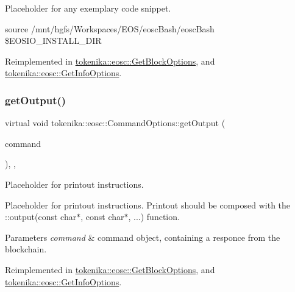 Placeholder for any exemplary code snippet. 

source /mnt/hgfs/\+Workspaces/\+E\+O\+S/eosc\+Bash/eosc\+Bash \$\+E\+O\+S\+I\+O\+\_\+\+I\+N\+S\+T\+A\+L\+L\+\_\+\+D\+IR 

Reimplemented in \hyperlink{classtokenika_1_1eosc_1_1_get_block_options_ace1d886b5fb260150df8d291339fbd03}{tokenika\+::eosc\+::\+Get\+Block\+Options}, and \hyperlink{classtokenika_1_1eosc_1_1_get_info_options_a652a64ac80195f98b33ae91a2b284316}{tokenika\+::eosc\+::\+Get\+Info\+Options}.

\mbox{\label{classtokenika_1_1eosc_1_1_command_options_a346dcfb00b8ac522169714544bfa7be0}} 
\subsubsection{\texorpdfstring{get\+Output()}{getOutput()}}
{\footnotesize\ttfamily virtual void tokenika\+::eosc\+::\+Command\+Options\+::get\+Output (\begin{DoxyParamCaption}\item[{\hyperlink{classtokenika_1_1eosc_1_1_eosc_command}{Eosc\+Command}}]{command }\end{DoxyParamCaption})\hspace{0.3cm}{\ttfamily [inline]}, {\ttfamily [protected]}, {\ttfamily [virtual]}}



Placeholder for printout instructions. 

Placeholder for printout instructions. Printout should be composed with the \+::output(const char$\ast$, const char$\ast$, ...) function.


\begin{DoxyParams}{Parameters}
{\em command} & command object, containing a responce from the blockchain. \\
\hline
\end{DoxyParams}


Reimplemented in \hyperlink{classtokenika_1_1eosc_1_1_get_block_options_a8d45be43c2a93468910db4533db832cc}{tokenika\+::eosc\+::\+Get\+Block\+Options}, and \hyperlink{classtokenika_1_1eosc_1_1_get_info_options_a73ebf397cd94b45513f1e049cbbb0eb5}{tokenika\+::eosc\+::\+Get\+Info\+Options}.

